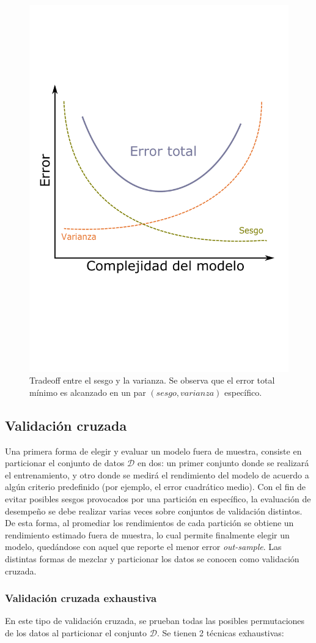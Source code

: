 \begin{figure}[h]
    \centering
    \includegraphics[width = 0.45\linewidth]{img/cap4_biasvariance.pdf}
    \caption{Tradeoff entre el sesgo y la varianza. Se observa que el error total mínimo es alcanzado en un par $(sesgo,varianza)$ específico.} 
\end{figure}


\subsection{Validación cruzada}

Una primera forma de elegir y evaluar un modelo fuera de muestra, consiste en particionar el conjunto de datos $\mathcal{D}$ en dos: un primer conjunto donde se realizará el entrenamiento, y otro donde se medirá el rendimiento del modelo de acuerdo a algún criterio predefinido (por ejemplo, el error cuadrático medio). Con el fin de evitar posibles sesgos provocados por una partición en específico, la evaluación de desempeño se debe realizar varias veces sobre conjuntos de validación distintos. De esta forma, al promediar los rendimientos de cada partición se obtiene un rendimiento estimado fuera de muestra, lo cual permite finalmente elegir un modelo, quedándose con aquel que reporte el menor error \textit{out-sample}. Las distintas formas de mezclar y particionar los datos se conocen como validación cruzada.

\subsubsection{Validación cruzada exhaustiva}

En este tipo de validación cruzada, se prueban todas las posibles permutaciones de los datos al particionar el conjunto $\mathcal{D}$. Se tienen 2 técnicas exhaustivas:

